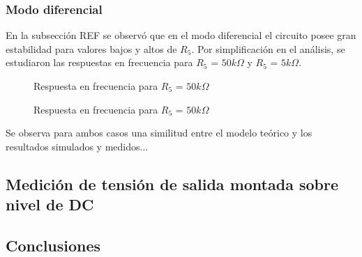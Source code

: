 \subsubsection{Modo diferencial}

En la subsección REF se observó que en el modo diferencial el circuito posee gran estabilidad para valores bajos y altos de $R_{5}$. Por simplificación en el análisis, se estudiaron las respuestas en frecuencia para $R_{5}$ = $50k\Omega$ y $R_{5}$ = $5k\Omega$.

\begin{figure}[H]
    \centering
    \hfill
    \caption{Respuesta en frecuencia para $R_{5}$ = $50k\Omega$}
  \end{figure}

  \begin{figure}[H]
    \centering
    \hfill
    \caption{Respuesta en frecuencia para $R_{5}$ = $50k\Omega$}
  \end{figure}

Se observa para ambos casos una similitud entre el modelo teórico y los resultados simulados y medidos...

\subsection{Medición de tensión de salida montada sobre nivel de DC}


\subsection{Conclusiones}


